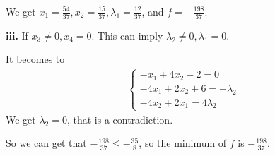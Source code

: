 \documentclass{report}
\begin{document}
\noindent
We get $x_1=\frac{54}{37},x_2=\frac{15}{37},\lambda_1 =\frac{12}{37}$, 
and $f=-\frac{198}{37}$. 

{\bf iii.} If $x_3\neq 0,x_4=0$. This can imply $\lambda_2\neq 0,\lambda_1 =0$.
\par It becomes to
\begin{align*}
    \begin{cases}
        -x_1 +4x_2-2=0\\
        -4x_1+2x_2+6=-\lambda_2\\
        -4x_2+2x_1=4\lambda_2
    \end{cases}
\end{align*}
We get $\lambda_2=0$, that is a contradiction. 

\vspace{1.em}
\par So we can get that $-\frac{198}{37}\leq -\frac{35}{8}$, so the minimum of $f$ 
is $-\frac{198}{37}$.
\end{document}
